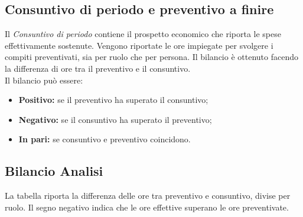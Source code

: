 \begin{flushleft}
    \chapter{Consuntivo di periodo e preventivo a finire}
    \label{consuntivoDiPeriodo}
    Il \textit{Consuntivo di periodo} contiene il prospetto economico che riporta le spese effettivamente sostenute. Vengono riportate le ore impiegate per svolgere i compiti preventivati, sia per
    ruolo che per persona. Il bilancio è ottenuto facendo la differenza di ore tra il preventivo e il consuntivo.\\
    Il bilancio può essere:
    \begin{itemize}
        \item \textbf{Positivo:} se il preventivo ha superato il consuntivo;
        \item \textbf{Negativo:} se il consuntivo ha superato il preventivo;
        \item \textbf{In pari:} se consuntivo e preventivo coincidono.
    \end{itemize}

   \newpage
    \section{Bilancio Analisi}
    La tabella riporta la differenza delle ore tra preventivo e consuntivo, divise per ruolo. Il segno negativo indica che le ore effettive superano le ore preventivate.  \\
      

\end{flushleft}
